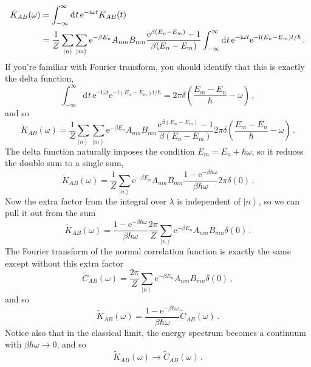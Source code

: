 \documentclass{article}
\theoremstyle{plain}\theoremheaderfont{\normalfont\itshape}\theorembodyfont{\rmfamily}\theoremseparator{.}\newtheorem*{rem}{Remark}\newtheorem*{ex}{Example}\newtheorem*{proof}{Proof}\newtheorem*{altp}{Alternative proof}
\theoremstyle{plain}\theoremheaderfont{\normalfont\bfseries}\theorembodyfont{\rmfamily}\theoremseparator{.}\newtheorem{thm}{Theorem}[section]\newtheorem{lem}[thm]{Lemma}\newtheorem{prop}[thm]{Proposition}\newtheorem*{cor}{Corollary}\newtheorem{defn}[thm]{Definition}\newtheorem{clm}[thm]{Claim}\newtheorem{clminproof}{Claim}
\theoremstyle{break}\theoremheaderfont{\normalfont\itshape}\theorembodyfont{\rmfamily}\theoremseparator{.\medskip}\newtheorem*{proofskip}{Proof}\newtheorem*{exs}{Examples}\newtheorem*{rems}{Remarks}
\theoremstyle{break}\theoremheaderfont{\normalfont\bfseries}\theorembodyfont{\rmfamily}\theoremseparator{.\medskip}\newtheorem{lemskip}[thm]{Lemma}\newtheorem{defnskip}[thm]{Definition}\newtheorem{propskip}[thm]{Proposition}\newtheorem{thmskip}[thm]{Theorem}
\numberwithin{equation}{section}
\newcommand{\ii}{\mathrm{i}}
\newcommand{\ee}{\mathrm{e}}
\newcommand{\dd}[2][]{\mathrm{d}^{#1} #2\,}
\newcommand{\ket}[1]{\left| #1 \right\rangle}
\begin{document}
    \begin{align}
        \tilde{K}_{AB}(\omega)&=\int_{-\infty}^{\infty}\dd{t} \ee^{-\ii\omega t}K_{AB}(t)\notag \\
        &=\frac{1}{Z}\sum_{\ket{n}}\sum_{\ket{m}}\ee^{-\beta E_n}A_{nm}B_{mn}\frac{\ee^{\beta(E_n-E_m)}-1}{\beta(E_n-E_m)}\int_{-\infty}^{\infty}\dd{t}\ee^{-\ii\omega t}\ee^{-\ii(E_n-E_m)t/\hbar}\,.
    \end{align}
    If you're familiar with Fourier transform, you should identify that this is exactly the delta function,
    \begin{equation}
        \int_{-\infty}^{\infty}\dd{t}\ee^{-\ii\omega t}\ee^{-\ii(E_n-E_m)t/\hbar}=2\pi\delta\left(\frac{E_m-E_n}{\hbar}-\omega\right)\,,
    \end{equation}
    and so
    \begin{equation}
        \tilde{K}_{AB}(\omega)=\frac{1}{Z}\sum_{\ket{n}}\sum_{\ket{m}}\ee^{-\beta E_n}A_{nm}B_{mn}\frac{\ee^{\beta(E_n-E_m)}-1}{\beta(E_n-E_m)}2\pi\delta\left(\frac{E_m-E_n}{\hbar}-\omega\right)\,.
    \end{equation}
    The delta function naturally imposes the condition \(E_m=E_n+\hbar\omega\), so it reduces the double sum to a single sum,
    \begin{equation}
        \tilde{K}_{AB}(\omega)=\frac{1}{Z}\sum_{\ket{n}}\ee^{-\beta E_n}A_{nm}B_{mn}\frac{1-\ee^{-\beta\hbar\omega}}{\beta\hbar\omega}2\pi\delta(0)\,.
    \end{equation}
    Now the extra factor from the integral over \(\lambda\) is independent of \(\ket{n}\), so we can pull it out from the sum
    \begin{equation}
        \tilde{K}_{AB}(\omega)=\frac{1-\ee^{-\beta\hbar\omega}}{\beta\hbar\omega}\frac{2\pi}{Z}\sum_{\ket{n}}\ee^{-\beta E_n}A_{nm}B_{mn}\delta(0)\,.
    \end{equation}
    The Fourier transform of the normal correlation function is exactly the same except without this extra factor
    \begin{equation}
        \tilde{C}_{AB}(\omega)=\frac{2\pi}{Z}\sum_{\ket{n}}\ee^{-\beta E_n}A_{nm}B_{mn}\delta(0)\,,
    \end{equation}
    and so
    \begin{equation}
        \tilde{K}_{AB}(\omega)=\frac{1-\ee^{-\beta\hbar\omega}}{\beta\hbar\omega}\tilde{C}_{AB}(\omega)\,.
    \end{equation}
    Notice also that in the classical limit, the energy spectrum becomes a continuum with \(\beta\hbar\omega\to 0\), and so
    \begin{equation}
        \tilde{K}_{AB}(\omega)\to \tilde{C}_{AB}(\omega)\,.
    \end{equation}
    
\end{document}
